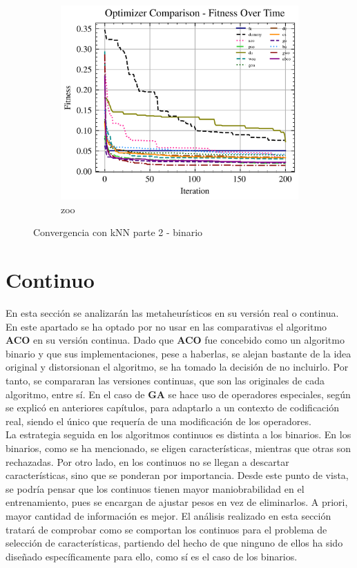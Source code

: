 \begin{figure}[htp]
    \begin{subfigure}[b]{0.45\textwidth}
        \includegraphics[width=\textwidth]{imagenes/fitness_charts/img/binary/zoo/optimizers_fitness_knn.png}
        \caption{zoo}
        \label{fig:convergencia_zoo_knn}
    \end{subfigure}
    \caption{Convergencia con kNN parte 2 - binario}
    \label{fig:convergencia_knn_2}
\end{figure}

\clearpage
\section{Continuo}
En esta sección se analizarán las metaheurísticos en su versión real o continua. En este apartado se ha optado por no usar en las comparativas el algoritmo \textbf{ACO} en su versión continua. Dado que \textbf{ACO} fue concebido como un algoritmo binario y que sus implementaciones, pese a haberlas, se alejan bastante de la idea original y distorsionan el algoritmo, se ha tomado la decisión de no incluirlo. Por tanto, se compararan las versiones continuas, que son las originales de cada algoritmo, entre sí. En el caso de \textbf{GA} se hace uso de operadores especiales, según se explicó en anteriores capítulos, para adaptarlo a un contexto de codificación real, siendo el único que requería de una modificación de los operadores.\\[6pt]
La estrategia seguida en los algoritmos continuos es distinta a los binarios. En los binarios, como se ha mencionado, se eligen características, mientras que otras son rechazadas. Por otro lado, en los continuos no se llegan a descartar características, sino que se ponderan por importancia. Desde este punto de vista, se podría pensar que los continuos tienen mayor maniobrabilidad en el entrenamiento, pues se encargan de ajustar pesos en vez de eliminarlos. A priori, mayor cantidad de información es mejor. El análisis realizado en esta sección tratará de comprobar como se comportan los continuos para el problema de selección de características, partiendo del hecho de que ninguno de ellos ha sido diseñado específicamente para ello, como sí es el caso de los binarios.

